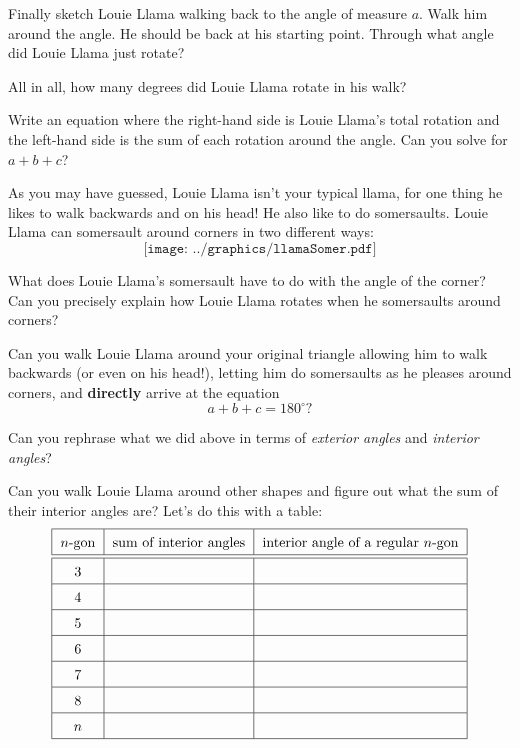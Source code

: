 \begin{prob}
Finally sketch Louie Llama walking back to the angle of measure
$a$. Walk him around the angle. He should be back at his starting
point. Through what angle did Louie Llama just rotate?
\end{prob}

\begin{prob} 
All in all, how many degrees did Louie Llama rotate in his walk?
\end{prob}

\begin{prob} 
Write an equation where the right-hand side is Louie Llama's total
rotation and the left-hand side is the sum of each rotation around the
angle. Can you solve for $a+b+c$?
\end{prob}

As you may have guessed, Louie Llama isn't your typical llama, for one
thing he likes to walk backwards and on his head! He also like to do
somersaults. Louie Llama can somersault around corners in two
different ways:
\[
\texttt{[image: ../graphics/llamaSomer.pdf]}
\]

\begin{prob} 
What does Louie Llama's somersault have to do with the angle of the
corner? Can you precisely explain how Louie Llama rotates when he
somersaults around corners?
\end{prob}


\begin{prob}
Can you walk Louie Llama around your original triangle allowing him to
walk backwards (or even on his head!), letting him do somersaults as
he pleases around corners, and \textbf{directly} arrive at the
equation
\[
a + b + c = 180^\circ?
\]
\end{prob}

\begin{prob} 
Can you rephrase what we did above in terms of \textit{exterior angles} and \textit{interior angles}?
\end{prob}

\break

\begin{prob} 
Can you walk Louie Llama around other shapes and figure out what the
sum of their interior angles are? Let's do this with a table:
\[
{\renewcommand{\arraystretch}{1.5}
\begin{tabular}{|c|c|c|}\hline
$n$-gon & sum of interior angles & interior angle of a regular $n$-gon\\\hline\hline
3 & & \\\hline
4 & & \\\hline
5 & & \\\hline
6 & & \\\hline
7 & & \\\hline
8 & & \\\hline
$n$ & & \\\hline
\end{tabular}}
\]
\end{prob}

